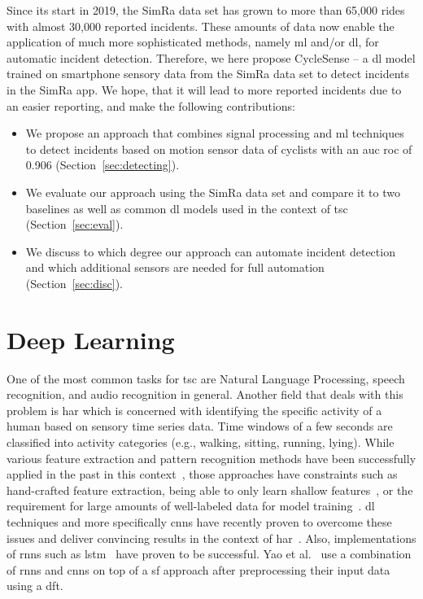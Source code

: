 Since its start in 2019, the SimRa data set has grown to more than 65,000 rides with almost 30,000 reported incidents.
These amounts of data now enable the application of much more sophisticated methods, namely \ac{ml} and/or \ac{dl}, for automatic incident detection.
Therefore, we here propose CycleSense -- a \ac{dl} model trained on smartphone sensory data from the SimRa data set to detect incidents in the SimRa app.
We hope, that it will lead to more reported incidents due to an easier reporting, and make the following contributions:

\begin{itemize}
	\item We propose an approach that combines signal processing and \ac{ml} techniques to detect incidents based on motion sensor data of cyclists with an \ac{auc} \ac{roc} of 0.906 (Section~\ref{sec:detecting}).
	\item We evaluate our approach using the SimRa data set and compare it to two baselines as well as common \acl{dl} models used in the context of \acl{tsc} (Section~\ref{sec:eval}).
	\item We discuss to which degree our approach can automate incident detection and which additional sensors are needed for full automation (Section~\ref{sec:disc}).
\end{itemize}

\section{Deep Learning}
\label{sec:deep_learning_background}
One of the most common tasks for \ac{tsc} are Natural Language Processing, speech recognition, and audio recognition in general.
Another field that deals with this problem is \acf{har} which is concerned with identifying the specific activity of a human based on sensory time series data.
Time windows of a few seconds are classified into activity categories (e.g., walking, sitting, running, lying).
While various feature extraction and pattern recognition methods have been successfully applied in the past in this context~\cite{bulling2014tutorial}, those approaches have constraints such as hand-crafted feature extraction, being able to only learn shallow features~\cite{yang2015deep}, or the requirement for large amounts of well-labeled data for model training~\cite{wang2019deep}.
\acl{dl} techniques and more specifically \acp{cnn} have recently proven to overcome these issues and deliver convincing results in the context of \ac{har}~\cite{wang2019deep,ronao2015deep}.
Also, implementations of \acp{rnn} such as \ac{lstm}~\cite{tao2016multicolumn,yao2017deepsense} have proven to be successful.
Yao et al.\ \cite{yao2017deepsense} use a combination of \acp{rnn} and \acp{cnn} on top of a \ac{sf} approach after preprocessing their input data using a \ac{dft}.


